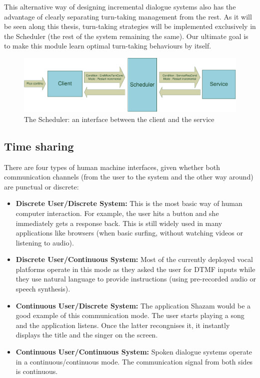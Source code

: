         This alternative way of designing incremental dialogue systems also has the advantage of clearly separating turn-taking management from the rest. As it will be seen along this thesis, turn-taking strategies will be implemented exclusively in the Scheduler (the rest of the system remaining the same). Our ultimate goal is to make this module learn optimal turn-taking behaviours by itself.
        
     	\begin{figure}[t]
          \centering
          \includegraphics[scale=0.7]{figures/ClientSchedService.pdf}
          \caption{The Scheduler: an interface between the client and the service}
          \label{fig:archioverview}
        \end{figure}
        
    \subsection{Time sharing}
    
    	There are four types of human machine interfaces, given whether both communication channels (from the user to the system and the other way around) are punctual or discrete:
        
        \begin{itemize}
        	\item \textbf{Discrete User/Discrete System:} This is the most basic way of human computer interaction. For example, the user hits a button and she immediately gets a response back. This is still widely used in many applications like browsers (when basic surfing, without watching videos or listening to audio).
            \item \textbf{Discrete User/Continuous System:} Most of the currently deployed vocal platforms operate in this mode as they asked the user for DTMF inputs while they use natural language to provide instructions (using pre-recorded audio or speech synthesis).
           	\item \textbf{Continuous User/Discrete System:} The application Shazam would be a good example of this communication mode. The user starts playing a song and the application listens. Once the latter recongnises it, it instantly displays the title and the singer on the screen.
            \item \textbf{Continuous User/Continuous System:} Spoken dialogue systems operate in a continuous/continuous mode. The communication signal from both sides is continuous.
        \end{itemize}
        
